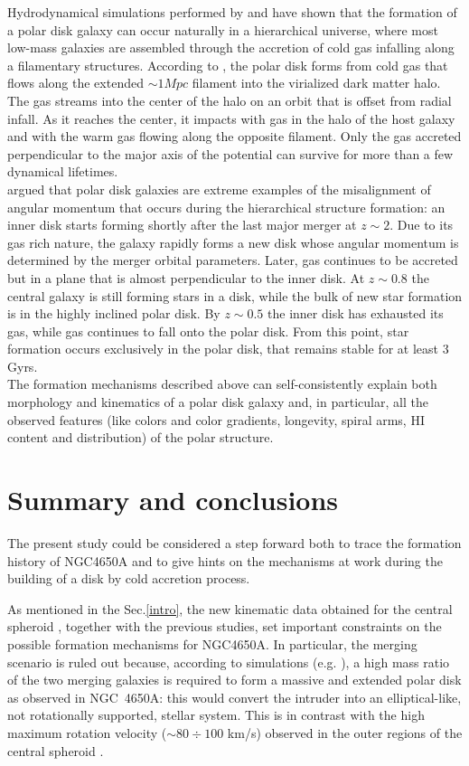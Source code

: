 \documentclass[12pt,preprint]{aastex}
\begin{document}
Hydrodynamical simulations performed by \citet{Mac06} and
\citet{Bro08} have shown that the formation of a polar disk galaxy can
occur naturally in a hierarchical universe, where most low-mass
galaxies are assembled through the accretion of cold gas infalling
along a filamentary structures. According to \citet{Mac06}, the polar
disk forms from cold gas that flows along the extended $\sim 1 Mpc$
filament into the virialized dark matter halo. The gas streams into
the center of the halo on an orbit that is offset from radial
infall. As it reaches the center, it impacts with gas in the halo of
the host galaxy and with the warm gas flowing along the opposite
filament. Only the gas accreted perpendicular to the major axis of the
potential can survive for more than a few dynamical lifetimes.\\
\citet{Bro08} argued that polar disk galaxies are extreme examples of
the misalignment of angular momentum that occurs during the
hierarchical structure formation: an inner disk starts forming shortly
after the last major merger at $z \sim 2$. Due to its gas rich nature,
the galaxy rapidly forms a new disk whose angular momentum is
determined by the merger orbital parameters. Later, gas continues to
be accreted but in a plane that is almost perpendicular to the inner
disk. At $z \sim 0.8$ the central galaxy is still forming stars in a
disk, while the bulk of new star formation is in the highly inclined
polar disk. By $z\sim 0.5$ the inner disk has exhausted its gas, while
gas continues to fall onto the polar disk. From this point, star
formation occurs exclusively in the polar disk, that remains stable
for at least 3 Gyrs.\\ The formation mechanisms described above can
self-consistently explain both morphology and kinematics of a polar
disk galaxy and, in particular, all the observed features (like colors
and color gradients, longevity, spiral arms, HI content and
distribution) of the polar structure.

\section{Summary and conclusions}\label{concl}

The present study could be considered a step forward both to trace the
formation history of NGC4650A and to give hints on the mechanisms at
work during the building of a disk by cold accretion process. 

As mentioned in the Sec.\ref{intro}, the new kinematic data
  obtained for the central spheroid \citep{Iod06}, together with the
  previous studies, set important constraints on the possible
  formation mechanisms for NGC4650A.  
In particular, the merging scenario is ruled out because,
  according to simulations (e.g. \citealt{Bou05}), a high mass ratio
  of the two merging galaxies is required to form a massive and
  extended polar disk as observed in NGC~4650A: this would convert the
  intruder into an elliptical-like, not rotationally supported,
  stellar system. This is in contrast with the high maximum rotation
  velocity ($\sim 80 \div 100$ km/s) observed in the outer regions of
  the central spheroid \citep{Iod06}.
\end{document}
